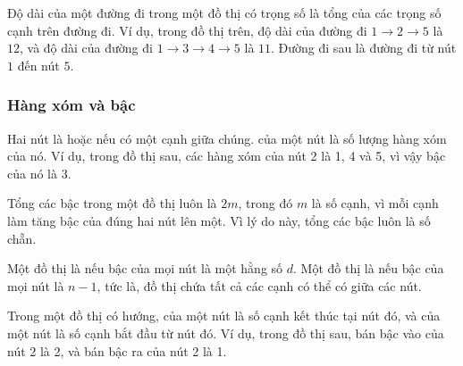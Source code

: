 Độ dài của một đường đi trong một đồ thị có trọng số
là tổng của các trọng số cạnh trên đường đi.
Ví dụ, trong đồ thị trên,
độ dài của đường đi
$1 \rightarrow 2 \rightarrow 5$ là $12$,
và độ dài của đường đi
$1 \rightarrow 3 \rightarrow 4 \rightarrow 5$ là $11$.
Đường đi sau là đường đi  từ nút $1$ đến nút $5$.

\subsubsection{Hàng xóm và bậc}


Hai nút là  hoặc 
nếu có một cạnh giữa chúng.
 của một nút
là số lượng hàng xóm của nó.
Ví dụ, trong đồ thị sau,
các hàng xóm của nút 2 là 1, 4 và 5,
vì vậy bậc của nó là 3.

\begin{center}
\end{center}

Tổng các bậc trong một đồ thị luôn là $2m$,
trong đó $m$ là số cạnh,
vì mỗi cạnh
làm tăng bậc của đúng hai nút lên một.
Vì lý do này, tổng các bậc luôn là số chẵn.


Một đồ thị là  nếu
bậc của mọi nút là một hằng số $d$.
Một đồ thị là  nếu
bậc của mọi nút là $n-1$, tức là,
đồ thị chứa tất cả các cạnh có thể có
giữa các nút.


Trong một đồ thị có hướng, 
của một nút là số cạnh
kết thúc tại nút đó,
và  của một nút
là số cạnh bắt đầu từ nút đó.
Ví dụ, trong đồ thị sau,
bán bậc vào của nút 2 là 2,
và bán bậc ra của nút 2 là 1.

\begin{center}
\end{center}

